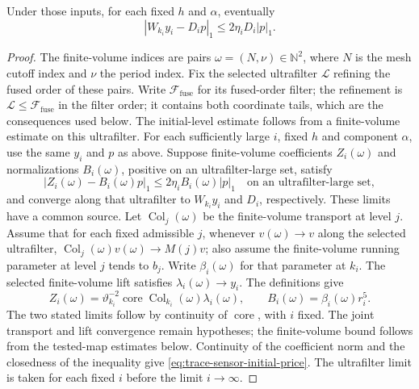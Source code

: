 \begin{lemma}\label{lem:trace-sensor-initial-price}
Under those inputs, for each fixed $h$ and $\alpha$, eventually
\begin{equation}
 |W_{k_i}y_i-D_ip|_1\le 2\eta_iD_i|p|_1.
 \label{eq:trace-sensor-initial-price}
\end{equation}
\end{lemma}
\nopagebreak
\begin{proof}
The finite-volume indices are pairs $\omega=(N,\nu)\in\mathbb N^2$,
where $N$ is the mesh cutoff index and $\nu$ the period index. Fix the selected
ultrafilter $\mathcal L$ refining the fused order of these pairs. Write
$\mathcal F_{\mathrm{fuse}}$ for its fused-order filter; the refinement is
$\mathcal L\le\mathcal F_{\mathrm{fuse}}$ in the filter order; it
contains both coordinate tails, which are the consequences used below. The initial-level
estimate follows from a finite-volume estimate on this ultrafilter. For each
sufficiently large $i$, fixed $h$ and component $\alpha$, use the same $y_i$
and $p$ as above. Suppose finite-volume coefficients $Z_i(\omega)$ and normalizations
$B_i(\omega)$, positive on an ultrafilter-large set, satisfy
\begin{equation}
 |Z_i(\omega)-B_i(\omega)p|_1\le
 2\eta_i B_i(\omega)|p|_1
 \quad\text{on an ultrafilter-large set},
 \label{eq:trace-sensor-finite-price}
\end{equation}
and converge along that ultrafilter to $W_{k_i}y_i$ and $D_i$,
respectively. These limits have a common source. Let $\operatorname{Col}_j(\omega)$
be the finite-volume transport at level $j$. Assume that for each fixed
admissible $j$, whenever $v(\omega)\to v$ along the selected ultrafilter,
$\operatorname{Col}_j(\omega)v(\omega)\to M(j)v$; also assume the finite-volume
running parameter at level $j$ tends to $b_j$. Write $\beta_i(\omega)$
for that parameter at $k_i$. The selected finite-volume lift satisfies $\lambda_i(\omega)\to y_i$. The definitions give
\[
 Z_i(\omega)=\vartheta_{k_i}^{-2}\operatorname{core}\operatorname{Col}_{k_i}(\omega)\lambda_i(\omega),
 \qquad B_i(\omega)=\beta_i(\omega)r_i^5.
\]
The two stated limits follow by continuity of $\operatorname{core}$, with $i$ fixed.
The joint transport and lift convergence remain hypotheses; the
finite-volume bound follows from the tested-map estimates below.
Continuity of the coefficient norm and the closedness of the inequality
give \eqref{eq:trace-sensor-initial-price}. The ultrafilter limit is taken
for each fixed $i$ before the limit $i\to\infty$.


\end{proof}
